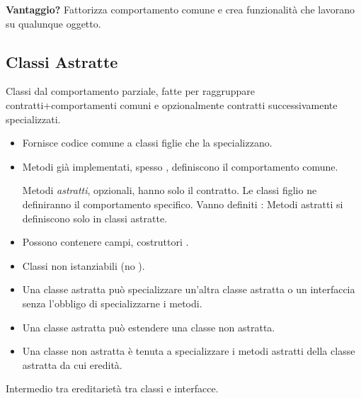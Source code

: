 \textbf{Vantaggio?} Fattorizza comportamento comune e crea funzionalità che lavorano su qualunque oggetto.




\subsection{Classi Astratte}
Classi dal comportamento parziale, fatte per raggruppare contratti+comportamenti comuni e opzionalmente contratti successivamente specializzati.


\begin{itemize}
	\item Fornisce codice comune a classi figlie che la specializzano.
	\item Metodi già implementati, spesso , definiscono il comportamento comune.

	Metodi \textit{astratti}, opzionali, hanno solo il contratto. Le classi figlio ne definiranno il comportamento specifico. Vanno definiti :
	Metodi astratti si definiscono solo in classi astratte.

	\item Possono contenere campi, costruttori .

	\item Classi non istanziabili (no ).
	\item Una classe astratta può specializzare un'altra classe astratta o un interfaccia senza l'obbligo di specializzarne i metodi.
	\item Una classe astratta può estendere una classe non astratta.
	\item Una classe non astratta è tenuta a specializzare i metodi astratti della classe astratta da cui eredità.
\end{itemize}Intermedio tra ereditarietà tra classi e interfacce.

